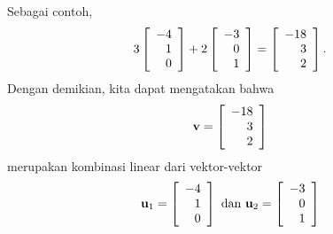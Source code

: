Sebagai contoh,
\begin{equation*}
3
\left[
\begin{array}{r}
-4 \\
1 \\
0
\end{array}
\right]
+
2
\left[
\begin{array}{r}
-3 \\
0\\
1
\end{array}
\right]
 =
\left[
\begin{array}{r}
-18 \\
3 \\
2
\end{array}
\right].
\end{equation*}
Dengan demikian, kita dapat mengatakan bahwa
\begin{equation*}
\mathbf{v}= \left[
\begin{array}{r}
-18 \\
3 \\
2
\end{array}
\right]
\end{equation*}
merupakan kombinasi linear dari vektor-vektor
\begin{equation*}
\mathbf{u}_1 = \left[
\begin{array}{r}
-4 \\
1 \\
0
\end{array}
\right]
\mbox{ dan }
\mathbf{u}_2 =
\left[
\begin{array}{r}
-3 \\
0\\
1
\end{array}
\right]
\end{equation*}
